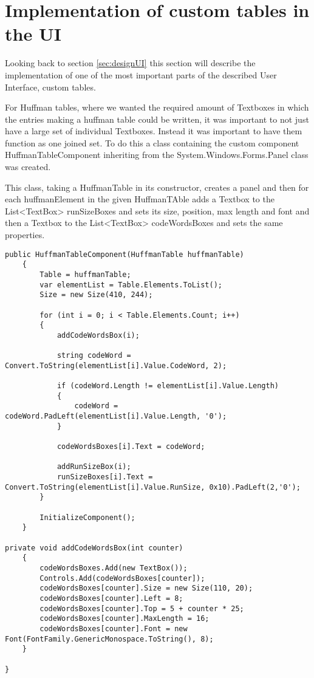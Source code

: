 \section{Implementation of custom tables in the UI}
Looking back to section \ref{sec:designUI} this section will describe the implementation of one of the most important parts of the described User Interface, custom tables.

For Huffman tables, where we wanted the required amount of Textboxes in which the entries making a huffman table could be written, it was important to not just have a large set of individual Textboxes.
Instead it was important to have them function as one joined set.
To do this a class containing the custom component HuffmanTableComponent inheriting from the System.Windows.Forms.Panel class was created. 

This class, taking a HuffmanTable in its constructor, creates a panel and then for each huffmanElement in the given HuffmanTAble adds a Textbox to the List<TextBox> runSizeBoxes and sets its size, position, max length and font and then a Textbox to the List<TextBox> codeWordsBoxes and sets the same properties.

\begin{lstlisting}[firstnumber=136,label=JPEGEncode, caption={\lstinline|JPEGImage.Encode| method \textbf{File: }JPEGImage.cs}]
public HuffmanTableComponent(HuffmanTable huffmanTable)
	{
		Table = huffmanTable;
		var elementList = Table.Elements.ToList();
		Size = new Size(410, 244);
		
		for (int i = 0; i < Table.Elements.Count; i++)
		{
			addCodeWordsBox(i);
			
			string codeWord = Convert.ToString(elementList[i].Value.CodeWord, 2);
			
			if (codeWord.Length != elementList[i].Value.Length)
			{
				codeWord = codeWord.PadLeft(elementList[i].Value.Length, '0');
			}
			
			codeWordsBoxes[i].Text = codeWord;
			
			addRunSizeBox(i);
			runSizeBoxes[i].Text = Convert.ToString(elementList[i].Value.RunSize, 0x10).PadLeft(2,'0');
		}
		
		InitializeComponent();
	}

private void addCodeWordsBox(int counter)
	{
		codeWordsBoxes.Add(new TextBox());
		Controls.Add(codeWordsBoxes[counter]);
		codeWordsBoxes[counter].Size = new Size(110, 20);
		codeWordsBoxes[counter].Left = 8;
		codeWordsBoxes[counter].Top = 5 + counter * 25;
		codeWordsBoxes[counter].MaxLength = 16;
		codeWordsBoxes[counter].Font = new Font(FontFamily.GenericMonospace.ToString(), 8);
	}

}
\end{lstlisting}

